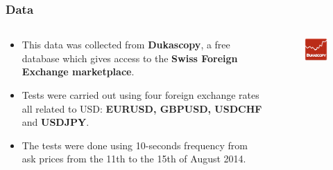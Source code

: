 \documentclass{beamer}
\begin{document}
\begin{frame}
\frametitle{Data}
\begin{columns}
\begin{column}{0.7\textwidth}
\begin{itemize}
\item This data was collected from {\bf Dukascopy}, a free
database which gives access to the {\bf Swiss Foreign Exchange marketplace}.
\item Tests were carried out using four foreign exchange rates all related to
USD: {\bf EURUSD, GBPUSD, USDCHF} and {\bf USDJPY}. 
\item The tests were done using 10-seconds frequency from ask prices
from the 11th to the 15th of August 2014. 
\end{itemize}
\end{column}
\begin{column}{0.3\textwidth}
 \begin{figure}[!h]
    \includegraphics[width=\textwidth]{img/dukascopy}
 \end{figure}
\end{column}
\end{columns}
\end{frame}
\end{document}
